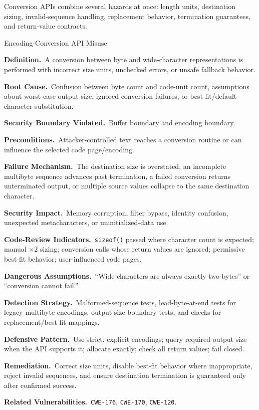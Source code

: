 \documentclass[11pt]{article}
\newcommand{\field}[1]{\par\smallskip\noindent\textbf{#1.}\ }
\newcommand{\cwe}[1]{\texttt{#1}}
\begin{document}
Conversion APIs combine several hazards at once: length units, destination sizing, invalid-sequence handling, replacement behavior, termination guarantees, and return-value contracts.

\begin{catalogbox}{Encoding-Conversion API Misuse}
\field{Definition}A conversion between byte and wide-character representations is performed with incorrect size units, unchecked errors, or unsafe fallback behavior.

\field{Root Cause}Confusion between byte count and code-unit count, assumptions about worst-case output size, ignored conversion failures, or best-fit/default-character substitution.

\field{Security Boundary Violated}Buffer boundary and encoding boundary.

\field{Preconditions}Attacker-controlled text reaches a conversion routine or can influence the selected code page/encoding.

\field{Failure Mechanism}The destination size is overstated, an incomplete multibyte sequence advances past termination, a failed conversion returns unterminated output, or multiple source values collapse to the same destination character.

\field{Security Impact}Memory corruption, filter bypass, identity confusion, unexpected metacharacters, or uninitialized-data use.

\field{Code-Review Indicators}\texttt{sizeof()} passed where character count is expected; manual \(\times 2\) sizing; conversion calls whose return values are ignored; permissive best-fit behavior; user-influenced code pages.

\field{Dangerous Assumptions}``Wide characters are always exactly two bytes'' or ``conversion cannot fail.''

\field{Detection Strategy}Malformed-sequence tests, lead-byte-at-end tests for legacy multibyte encodings, output-size boundary tests, and checks for replacement/best-fit mappings.

\field{Defensive Pattern}Use strict, explicit encodings; query required output size when the API supports it; allocate exactly; check all return values; fail closed.

\field{Remediation}Correct size units, disable best-fit behavior where inappropriate, reject invalid sequences, and ensure destination termination is guaranteed only after confirmed success.

\field{Related Vulnerabilities}\cwe{CWE-176}, \cwe{CWE-170}, \cwe{CWE-120}.
\end{catalogbox}
\clearpage
\end{document}
